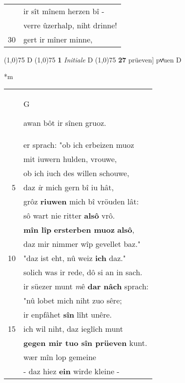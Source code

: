\documentclass[8pt,a4paper,notitlepage]{article}
\begin{document}
\begin{table}[ht]
\begin{minipage}[t]{0.5\linewidth}
\begin{tabular}{rl}
 & ir sît mînem herzen bî -\\ 
 & verre ûzerhalp, niht drinne!\\ 
30 & gert ir mîner minne,\\ 
\end{tabular}
\scriptsize
\line(1,0){75} \newline
D \newline
\line(1,0){75} \newline
\textbf{1} \textit{Initiale} D  \newline
\line(1,0){75} \newline
\textbf{27} prüeven] pvͤuen D \newline
\end{minipage}
\hspace{0.5cm}
\begin{minipage}[t]{0.5\linewidth}
\small
\begin{center}*m
\end{center}
\begin{tabular}{rl}
 & \begin{large}G\end{large}awan bôt ir sînen gruoz.\\ 
 & er sprach: "ob ich erbeizen muoz\\ 
 & mit iuwern hulden, vrouwe,\\ 
 & ob ich iuch des willen schouwe,\\ 
5 & daz \textit{i}r mich gern bî iu hât,\\ 
 & grôz \textbf{riuwen} mich bî vröuden lât:\\ 
 & sô wart nie ritter \textbf{alsô} vrô.\\ 
 & \textbf{mîn lîp} \textbf{ersterben muoz} \textbf{alsô},\\ 
 & daz mir nimmer wîp gevellet baz."\\ 
10 & "daz ist eht, nû weiz \textbf{ich} daz."\\ 
 & solich was ir rede, dô si an in sach.\\ 
 & ir süezer munt \textit{m}ê \textbf{dar nâch} sprach:\\ 
 & "nû lobet mich niht zuo sêre;\\ 
 & ir enpfâhet \textbf{sîn} lîht unêre.\\ 
15 & ich wil niht, daz ieglîch munt\\ 
 & \textbf{gegen mir tuo sîn prüeven} kunt.\\ 
 & wær mîn lop gemeine\\ 
 & - daz hiez \textbf{ein} wirde kleine -\\ 

\end{tabular}
\end{minipage}
\end{table}
\end{document}
